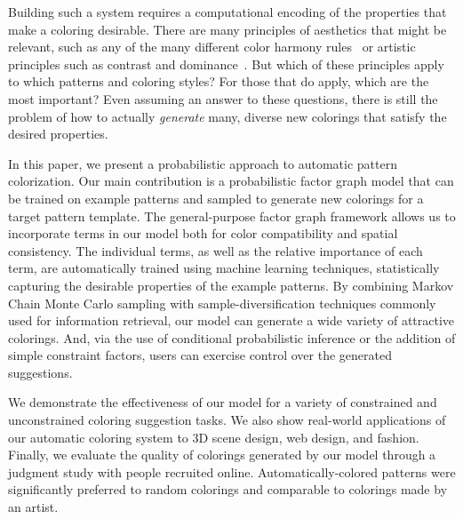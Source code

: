 Building such a system requires a computational encoding of the properties that make a coloring desirable. There are many principles of aesthetics that might be relevant, such as any of the many different color harmony rules~\cite{ColorHarmonyBook} or artistic principles such as contrast and dominance~\cite{ArtPrinciples}. But which of these principles apply to which patterns and coloring styles? For those that do apply, which are the most important? Even assuming an answer to these questions, there is still the problem of how to actually \emph{generate} many, diverse new colorings that satisfy the desired properties.

In this paper, we present a probabilistic approach to automatic pattern colorization. Our main contribution is a probabilistic factor graph model that can be trained on example patterns and sampled to generate new colorings for a target pattern template. The general-purpose factor graph framework allows us to incorporate terms in our model both for color compatibility and spatial consistency. The individual terms, as well as the relative importance of each term, are automatically trained using machine learning techniques, statistically capturing the desirable properties of the example patterns. By combining Markov Chain Monte Carlo sampling with sample-diversification techniques commonly used for information retrieval, our model can generate a wide variety of attractive colorings. And, via the use of conditional probabilistic inference or the addition of simple constraint factors, users can exercise control over the generated suggestions.

We demonstrate the effectiveness of our model for a variety of constrained and unconstrained coloring suggestion tasks. We also show real-world applications of our automatic coloring system to 3D scene design, web design, and fashion. Finally, we evaluate the quality of colorings generated by our model through a judgment study with people recruited online. Automatically-colored patterns were significantly preferred to random colorings and comparable to colorings made by an artist.

